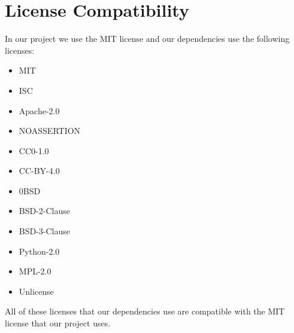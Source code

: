 \section{License Compatibility}
In our project we use the MIT license and our dependencies use the following licenses:
\begin{itemize}
    \item MIT
    \item ISC
    \item Apache-2.0
    \item NOASSERTION
    \item CC0-1.0
    \item CC-BY-4.0
    \item 0BSD
    \item BSD-2-Clause
    \item BSD-3-Clause
    \item Python-2.0
    \item MPL-2.0
    \item Unlicense
\end{itemize}

All of these licenses that our dependencies use are compatible with the MIT license that our project uses.